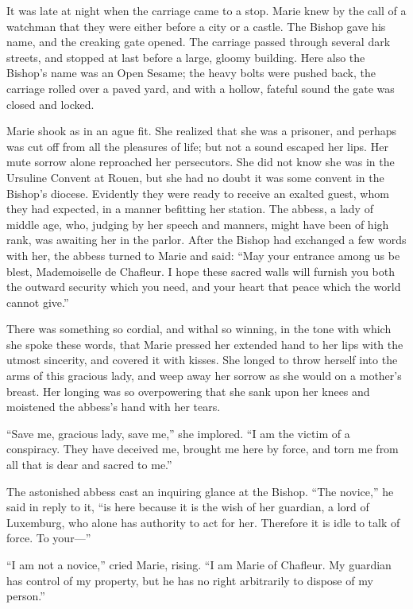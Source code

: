 It was late at night when the carriage came to a stop. Marie knew by the
call of a watchman that they were either before a city or a castle. The
Bishop gave his name, and the creaking gate opened. The carriage passed
through several dark streets, and stopped at last before a large, gloomy
building. Here also the Bishop's name was an Open Sesame; the heavy
bolts were pushed back, the carriage rolled over a paved yard, and with
a hollow, fateful sound the gate was closed and locked.

Marie shook as in an ague fit. She realized that she was a prisoner, and
perhaps was cut off from all the pleasures of life; but not a sound
escaped her lips. Her mute sorrow alone reproached her persecutors. She
did not know she was in the Ursuline Convent at Rouen, but she had no
doubt it was some convent in the Bishop's diocese. Evidently they were
ready to receive an exalted guest, whom they had expected, in a manner
befitting her station. The abbess, a lady of middle age, who, judging by
her speech and manners, might have been of high rank, was awaiting her
in the parlor. After the Bishop had exchanged a few words with her, the
abbess turned to Marie and said: ``May your entrance among us be blest,
Mademoiselle de Chafleur. I hope these sacred walls will furnish you
both the outward security which you need, and your heart that peace
which the world cannot give.''

There was something so cordial, and withal so winning, in the tone with
which she spoke these words, that Marie pressed her extended hand to her
lips with the utmost sincerity, and covered it with kisses. She longed
to throw herself into the arms of this gracious lady, and weep away her
sorrow as she would on a mother's breast. Her longing was so
overpowering that she sank upon her knees and moistened the abbess's
hand with her tears.

``Save me, gracious lady, save me,'' she implored. ``I am the victim of
a conspiracy. They have deceived me, brought me here by force, and torn
me from all that is dear and sacred to me.''

The astonished abbess cast an inquiring glance at the Bishop. ``The
novice,'' he said in reply to it, ``is here because it is the wish of
her guardian, a lord of Luxemburg, who alone has authority to act for
her. Therefore it is idle to talk of force. To your---''

``I am not a novice,'' cried Marie, rising. ``I am Marie of Chafleur. My
guardian has control of my property, but he has no right arbitrarily to
dispose of my person.''

